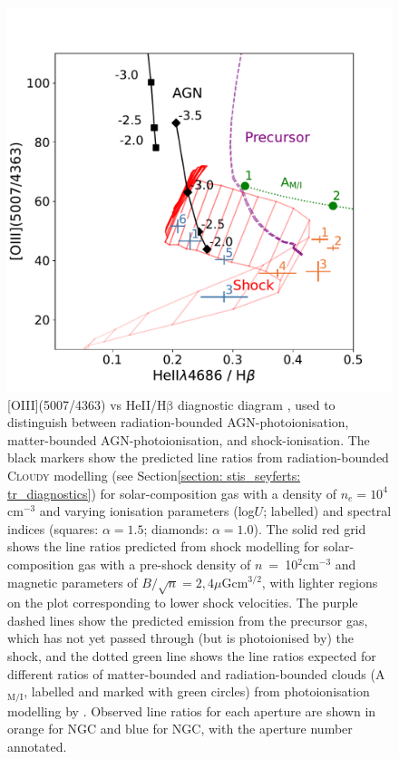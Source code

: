 \begin{figure}[!p]
    \centering
    \includegraphics[width=0.8\linewidth]{figures/stis_seyferts/oiii_heii_hb_stis.pdf}
    \caption[HeII$\lambda$4686/H$\mathrm{\beta}$ vs {[}OIII{]}5007/{[}OIII{]}$\lambda$4363 diagnostic diagram for the warm-ionised gas in NGC and NGC, including modelled values for (radiation-bounded and matter-bounded) photo- and shock-ionised gas.]{[OIII](5007/4363) vs HeII/H$\mathrm{\beta}$ diagnostic diagram \citep{VillarMartin1999}, used to distinguish between radiation-bounded AGN-photoionisation, matter-bounded AGN-photoionisation, and shock-ionisation. The black markers show the predicted line ratios from radiation-bounded \textsc{Cloudy} modelling (see Section\;\ref{section: stis_seyferts: tr_diagnostics}) for solar-composition gas with a density of \mbox{$n_e=10^{4}$\;cm$^{-3}$} and varying ionisation parameters (log\;$U$; labelled) and spectral indices (squares: $\alpha=1.5$; diamonds: $\alpha=1.0$). The solid red grid shows the line ratios predicted from shock modelling \citep{Allen2008} for solar-composition gas with a pre-shock density of \mbox{$n$ = 10$^{2}$\;cm$^{-3}$} and magnetic parameters of \mbox{$B/\sqrt{n}=2,4$\;$\mu$G\;cm$^{3/2}$}, with lighter regions on the plot corresponding to lower shock velocities. The purple dashed lines show the predicted emission from the precursor gas, which has not yet passed through (but is photoionised by) the shock, and the dotted green line shows the line ratios expected for different ratios of matter-bounded and radiation-bounded clouds (A$_\mathrm{M/I}$, labelled and marked with green circles) from photoionisation modelling by \citet{Binette1996}. Observed line ratios for each aperture are shown in orange for NGC and blue for NGC, with the aperture number annotated.}
    \label{fig: stis_seyferts: oiii_heii_hbeta_stis}
\end{figure}

